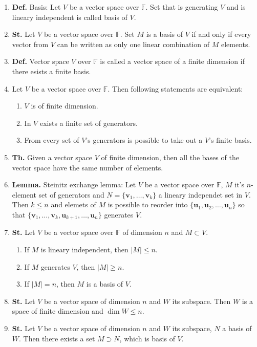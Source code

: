 \documentclass{article}
\newcommand{\<}{\left<}
\renewcommand{\>}{\right>}
\newcommand{\F}{\mathbb{F}}
\newcommand{\define}{\textbf{Def. }}
\newcommand{\lemma}{\textbf{Lemma. }}
\newcommand{\state}{\textbf{St. }}
\newcommand{\theor}{\textbf{Th. }}
\begin{document}
\begin{multicols}{3}
\begin{enumerate}[itemsep=2pt, topsep=2pt, partopsep=2pt, parsep=2pt]
        \item \define Basis: Let $V$ be a vector space over $\F$. Set that is generating $V$ and is lineary independent is called basis of $V$.
        \item \state Let $V$ be a vector space over $\F$. Set $M$ is a basis of $V$ if and only if every vector from $V$ can be written as only one linear combination of $M$ elements.
        \item \define Vector space $V$ over $\F$ is called a vector space of a finite dimension if there esists a finite basis.
        \item Let $V$ be a vector space over $\F$. Then following statements are equivalent:
            \begin{enumerate}[itemsep=0pt, topsep=0pt, partopsep=0pt, parsep=0pt]
                \item $V$ is of finite dimension.
                \item In $V$ exists a finite set of generators.
                \item From every set of $V$'s generators is possible to take out a $V$'s finite basis.
            \end{enumerate}
        \item \theor Given a vector space $V$ of finite dimension, then all the bases of the vector space have the same number of elements.
        \item \lemma Steinitz exchange lemma: Let $V$ be a vector space over $\F$, $M$ it's $n$-element set of generators and $N=\{\bm v_1,\ldots,\bm v_k\}$ a lineary independet set in $V$. Then $k\leq n$ and elemets of $M$ is possible to reorder into $\{\bm u_1,\bm u_2,\ldots,\bm u_n\}$ so that $\{\bm v_1,\ldots,\bm v_k,\bm u_{k+1},\ldots,\bm u_n\}$ generates $V$.
        \item \state Let $V$ be a vector space over $\F$ of dimension $n$ and $M\subset V$.
            \begin{enumerate}[itemsep=0pt, topsep=0pt, partopsep=0pt, parsep=0pt]
                \item If $M$ is lineary independent, then $|M|\leq n$.
                \item If $M$ generates $V$, then $|M|\geq n$.
                \item If $|M|=n$, then $M$ is a basis of $V$.
            \end{enumerate}
        \item \state Let $V$ be a vector space of dimension $n$ and $W$ its subspace. Then $W$ is a space of finite dimension and $\dim W\leq n$.
        \item \state Let $V$ be a vector space of dimension $n$ and $W$ its subspace, $N$ a basis of $W$. Then there exists a set $M\supset N$, which is basis of $V$.


\end{enumerate}
\end{multicols}
\end{document}
